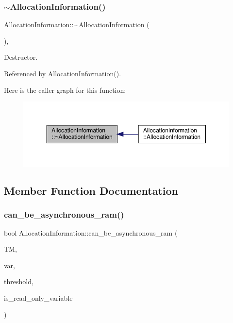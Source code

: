 \subsubsection{\texorpdfstring{$\sim$\+Allocation\+Information()}{~AllocationInformation()}}
{\footnotesize\ttfamily Allocation\+Information\+::$\sim$\+Allocation\+Information (\begin{DoxyParamCaption}{ }\end{DoxyParamCaption})\hspace{0.3cm}{\ttfamily [override]}, {\ttfamily [default]}}



Destructor. 



Referenced by Allocation\+Information().

Here is the caller graph for this function\+:
\nopagebreak
\begin{figure}[H]
\begin{center}
\leavevmode
\includegraphics[width=350pt]{d7/d79/classAllocationInformation_a102ad3015bf873da2b0c35280849f727_icgraph}
\end{center}
\end{figure}


\subsection{Member Function Documentation}
\mbox{\label{classAllocationInformation_a3f008043819189ad03f0d1d8c510c626}} 
\subsubsection{\texorpdfstring{can\+\_\+be\+\_\+asynchronous\+\_\+ram()}{can\_be\_asynchronous\_ram()}}
{\footnotesize\ttfamily bool Allocation\+Information\+::can\+\_\+be\+\_\+asynchronous\+\_\+ram (\begin{DoxyParamCaption}\item[{\hyperlink{tree__manager_8hpp_a792e3f1f892d7d997a8d8a4a12e39346}{tree\+\_\+manager\+Const\+Ref}}]{TM,  }\item[{unsigned int}]{var,  }\item[{unsigned int}]{threshold,  }\item[{bool}]{is\+\_\+read\+\_\+only\+\_\+variable }\end{DoxyParamCaption})\hspace{0.3cm}{\ttfamily [static]}}



